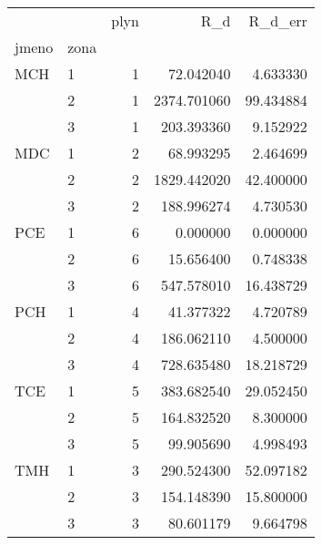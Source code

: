 \begin{tabular}{llrrr}
\toprule
    &   &  plyn &          R_d &    R_d_err \\
jmeno & zona &       &              &            \\
\midrule
MCH & 1 &     1 &    72.042040 &   4.633330 \\
    & 2 &     1 &  2374.701060 &  99.434884 \\
    & 3 &     1 &   203.393360 &   9.152922 \\
MDC & 1 &     2 &    68.993295 &   2.464699 \\
    & 2 &     2 &  1829.442020 &  42.400000 \\
    & 3 &     2 &   188.996274 &   4.730530 \\
PCE & 1 &     6 &     0.000000 &   0.000000 \\
    & 2 &     6 &    15.656400 &   0.748338 \\
    & 3 &     6 &   547.578010 &  16.438729 \\
PCH & 1 &     4 &    41.377322 &   4.720789 \\
    & 2 &     4 &   186.062110 &   4.500000 \\
    & 3 &     4 &   728.635480 &  18.218729 \\
TCE & 1 &     5 &   383.682540 &  29.052450 \\
    & 2 &     5 &   164.832520 &   8.300000 \\
    & 3 &     5 &    99.905690 &   4.998493 \\
TMH & 1 &     3 &   290.524300 &  52.097182 \\
    & 2 &     3 &   154.148390 &  15.800000 \\
    & 3 &     3 &    80.601179 &   9.664798 \\
\bottomrule
\end{tabular}
